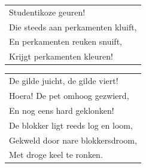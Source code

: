 \documentclass{article}
\begin{document}
\begin{flushleft}
\begin{tabularx}{0.8\textwidth} {
   >{\raggedright\arraybackslash}X}
Studentikoze geuren!\\
Die steeds aan perkamenten kluift,\\
En perkamenten reuken snuift,\\
Krijgt perkamenten kleuren!\\
\end{tabularx}
\end{flushleft}\begin{flushleft}
\begin{tabularx}{0.8\textwidth} {
   >{\raggedright\arraybackslash}X}
De gilde juicht, de gilde viert!\\
Hoera! De pet omhoog gezwierd,\\
En nog eens hard geklonken!\\
De blokker ligt reeds log en loom,\\
Gekweld door nare blokkersdroom,\\
Met droge keel te ronken.\\
\end{tabularx}
\end{flushleft}
\end{document}
